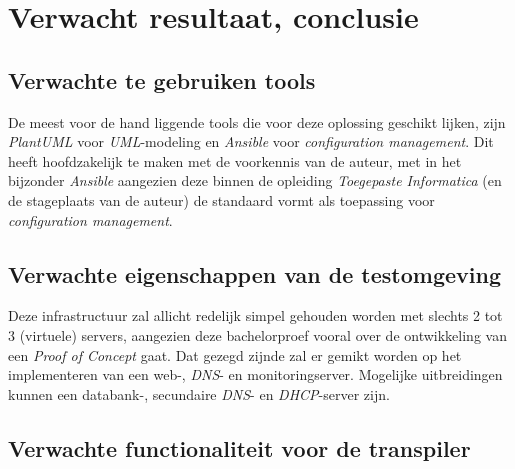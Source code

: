 

\section{Verwacht resultaat, conclusie}%
\label{sec:voorstel_verwachte_resultaten}

\subsection{Verwachte te gebruiken tools}%
\label{subsec:voorstel_verwachte_te_gebruiken_tools}

De meest voor de hand liggende tools die voor deze oplossing geschikt lijken, zijn \emph{PlantUML} voor \emph{UML}-modeling en \emph{Ansible} voor \emph{configuration management}.
Dit heeft hoofdzakelijk te maken met de voorkennis van de auteur, met in het bijzonder \emph{Ansible} aangezien deze binnen de opleiding \emph{Toegepaste Informatica} (en de stageplaats van de auteur) de standaard vormt als toepassing voor \emph{configuration management}.

\subsection{Verwachte eigenschappen van de testomgeving}
\label{subsec:voorstel_verwachte_eigenschappen_testomgeving}

Deze infrastructuur zal allicht redelijk simpel gehouden worden met slechts 2 tot 3 (virtuele) servers, aangezien deze bachelorproef vooral over de ontwikkeling van een \emph{Proof of Concept} gaat. Dat gezegd zijnde zal er gemikt worden op het implementeren van een web-, \emph{DNS}- en monitoringserver. Mogelijke uitbreidingen kunnen een databank-, secundaire \emph{DNS}- en \emph{DHCP}-server zijn.

\subsection{Verwachte functionaliteit voor de transpiler}%
\label{subsec:voorstel_verwachte_functionaliteit_poc}

